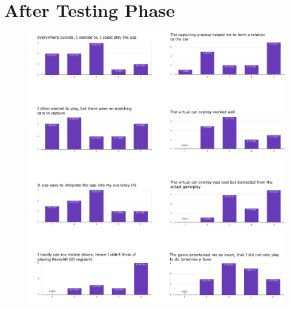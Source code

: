 \clearpage

\section{After Testing Phase}
\begin{figure}[btph]
  \centering
        \includegraphics[width=.99\linewidth]{gfx/Evaluation_post}
        \label{fig:evaluationPost}
\end{figure}

\clearpage

